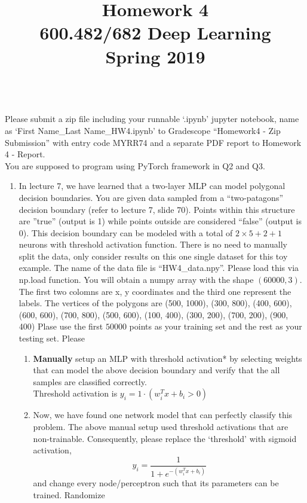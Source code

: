 \documentclass[a4paper]{article}
\title{Homework 4\\
	600.482/682 Deep Learning\\
	Spring 2019}
\begin{document}
	\maketitle
	
	\\
			Please submit a zip file including your runnable `.ipynb' jupyter notebook, name as `First Name\_Last Name\_HW4.ipynb'
			to Gradescope ``Homework4 - Zip Submission'' with entry code MYRR74 and a separate PDF report to Homework 4 - Report.\\
			You are supposed to program using PyTorch framework in Q2 and Q3.\\
	
	\begin{enumerate}
		\item In lecture 7, we have learned that a two-layer MLP can model polygonal decision boundaries. You are given data sampled from a ``two-patagons'' decision boundary (refer to lecture 7, slide 70). Points within this structure are ''true'' (output is 1) while points outside are considered ``false'' (output is 0). This decision boundary can be modeled with a total of $2\times 5 + 2 + 1$ neurons with threshold activation function. There is no need to manually split the data, only consider results on this one single dataset for this toy example. The name of the data file is ``HW4\_data.npy''. Please load this via np.load function. You will obtain a numpy array with the shape $(60000, 3)$. The first two colomns are x, y coordinates and the third one represent the labels. The vertices of the polygons are (500, 1000), (300, 800), (400, 600), (600, 600), (700, 800), (500, 600), (100, 400), (300, 200), (700, 200), (900, 400) Plase use the first $50000$ points as your training set and the rest as your testing set. Please
		\begin{enumerate}
			\item \textbf{Manually} setup an MLP with threshold activation* by selecting weights that can model the above decision boundary and verify that the all samples are classified correctly.\\
				Threshold activation is  $y_i=1\cdot(w_i^Tx+b_i>0)$
			\item Now, we have found one network model that can perfectly classify this problem. The above manual setup used threshold activations that are non-trainable. Consequently, please replace the `threshold' with sigmoid activation, $$y_i=\frac{1}{1+e^{-(w_i^Tx+b_i)}}$$
			and change every node/perceptron such that its parameters can be trained. Randomize 

\end{enumerate}
\end{enumerate}
\end{document}
